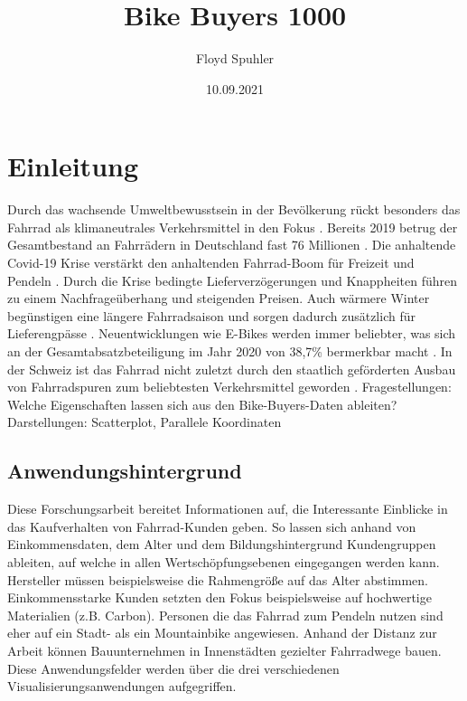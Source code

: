 \documentclass[usegeometry=true]{scrartcl}
\begin{document}
\subject{Projektbericht zum Modul Information Retrieval und Visualisierung Sommersemester 2021}

\title{Bike Buyers 1000}
\author{Floyd Spuhler}%
\date{10.09.2021}
\maketitle%
\newpage
\tableofcontents
\newpage
\section{Einleitung}
Durch das wachsende Umweltbewusstsein in der Bevölkerung rückt besonders das Fahrrad als klimaneutrales Verkehrsmittel in den Fokus \cite{Marquart.2021}. Bereits 2019 betrug der Gesamtbestand an Fahrrädern in Deutschland fast 76 Millionen \cite{Kords.26.06.2020,Statista.25.08.2021}. Die anhaltende Covid-19 Krise verstärkt den anhaltenden Fahrrad-Boom für Freizeit und  Pendeln \cite{Platter.2020}. Durch die Krise bedingte Lieferverzögerungen und Knappheiten führen zu einem Nachfrageüberhang und steigenden Preisen. Auch wärmere Winter begünstigen eine längere Fahrradsaison und sorgen dadurch zusätzlich für Lieferengpässe \cite{tagesschau.11.03.2021}. Neuentwicklungen wie E-Bikes werden immer beliebter, was sich an der Gesamtabsatzbeteiligung im Jahr 2020 von 38,7\% bermerkbar macht \cite{tagesschau.11.03.2021}. 
In der Schweiz ist das Fahrrad nicht zuletzt durch den staatlich geförderten Ausbau von Fahrradspuren zum beliebtesten Verkehrsmittel geworden \cite{Platter.2020}.
\newline Fragestellungen: Welche Eigenschaften lassen sich aus den Bike-Buyers-Daten ableiten? Darstellungen: Scatterplot, Parallele Koordinaten

\subsection{Anwendungshintergrund}


Diese Forschungsarbeit bereitet Informationen auf, die Interessante Einblicke in das Kaufverhalten von Fahrrad-Kunden geben. So lassen sich anhand von Einkommensdaten, dem Alter und dem Bildungshintergrund Kundengruppen ableiten, auf welche in allen Wertschöpfungsebenen eingegangen werden kann. Hersteller müssen beispielsweise die Rahmengröße auf das Alter abstimmen. Einkommensstarke Kunden setzten den Fokus beispielsweise auf hochwertige Materialien (z.B. Carbon). Personen die das Fahrrad zum Pendeln nutzen sind eher auf ein Stadt- als ein Mountainbike angewiesen. Anhand der Distanz zur Arbeit können Bauunternehmen in Innenstädten gezielter Fahrradwege bauen. Diese Anwendungsfelder werden über die drei verschiedenen Visualisierungsanwendungen aufgegriffen. 
\end{document}
